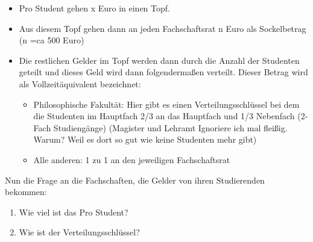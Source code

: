       \begin{itemize}
        \item Pro Student gehen x Euro in einen Topf.
        \item Aus diesem Topf gehen dann an jeden Fachschaftsrat n Euro als Sockelbetrag (n =ca 500 Euro)
        \item Die restlichen Gelder im Topf werden dann durch die Anzahl der Studenten geteilt und dieses Geld wird dann folgendermaßen verteilt. Dieser Betrag wird als Vollzeitäquivalent bezeichnet:
          \begin{itemize}
            \item Philosophische Fakultät: Hier gibt es einen Verteilungsschlüssel bei dem die Studenten im Hauptfach 2/3 an das Hauptfach und 1/3 Nebenfach (2-Fach Studiengänge) (Magister und Lehramt Ignoriere ich mal fleißig. Warum? Weil es dort so gut wie keine Studenten mehr gibt)
            \item Alle anderen: 1 zu 1 an den jeweiligen Fachschaftsrat
          \end{itemize}
      \end{itemize}
      Nun die Frage an die Fachschaften, die Gelder von ihren Studierenden bekommen: \\
      \begin{enumerate}
        \item Wie viel ist das Pro Student?
        \item Wie ist der Verteilungsschlüssel?
      \end{enumerate}

